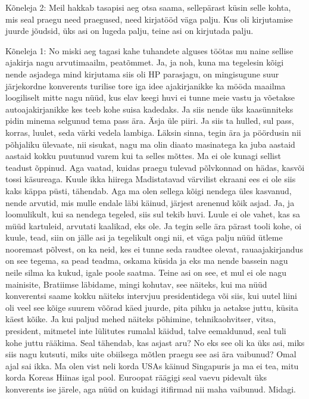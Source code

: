 Kõneleja 2:
Meil hakkab tasapisi aeg otsa saama, sellepärast küsin selle kohta, mis seal praegu need praegused, need kirjatööd väga palju. Kus oli kirjutamise juurde jõudsid, üks asi on lugeda palju, teine asi on kirjutada palju.
                 
Kõneleja 1:
No miski aeg tagasi kahe tuhandete alguses töötas mu naine sellise ajakirja nagu arvutimaailm, peatõmmet.
Ja, ja noh, kuna ma tegelesin kõigi nende asjadega mind kirjutama siis oli HP parasjagu, on mingisugune suur järjekordne konverents turilise tore iga idee ajakirjanikke ka mööda maailma loogiliselt mitte nagu nüüd, kus elav keegi huvi ei tunne meie vastu ja võetakse autoajakirjanikke kes teeb kohe suisa kadedaks.
Ja siis nende üks kaasünniteks pidin minema selgunud tema pass ära. Äsja üle piiri.
Ja siis ta hulled, sul pass, korras, luulet, seda värki vedela lambiga. Läksin sinna, tegin ära ja pöördusin nii põhjaliku ülevaate, nii sisukat, nagu ma olin diaato masinatega ka juba aastaid aastaid kokku puutunud varem kui ta selles mõttes. Ma ei ole kunagi sellist teadust õppinud. Aga vaatad, kuidas praegu tulevad põlvkonnad on hädas, kasvõi tossi käsureaga. Kuule ikka hiirega Madistatavad värvilist ekraani ees ei ole siis kaks käppa püsti, tähendab. Aga ma olen sellega kõigi nendega üles kasvanud, nende arvutid, mis mulle endale läbi käinud, järjest arenenud kõik asjad. Ja, ja loomulikult, kui sa nendega tegeled, siis sul tekib huvi. Luule ei ole vahet, kas sa müüd kartuleid, arvutati kaalikad, eks ole. Ja tegin selle ära pärast tooli kohe, oi kuule, tead, siin on jälle asi ja tegelikult ongi nii, et väga palju nüüd ütleme nooremast põlvest, on ka neid, kes ei tunne seda raudtee olevat, rauaajakirjandus on see tegema, sa pead teadma, oskama küsida ja eks ma nende bassein nagu neile silma ka kukud, igale poole saatma. Teine asi on see, et mul ei ole nagu mainisite, Bratiimse läbidame, mingi kohutav, see näiteks, kui ma nüüd konverentsi saame kokku näiteks intervjuu presidentidega või siis, kui uutel liini oli veel see kõige suurem võõrad käed juurde, pita pihku ja aetakse juttu, küsita käest kõike. Ja kui paljud mehed näiteks põhimine, tehnikaohvitser, vitsa, president, mitmetel inte lülitutes rumalal käidud, talve eemaldunud, seal tuli kohe juttu rääkima. Seal tähendab, kas asjast aru? No eks see oli ka üks asi, miks siis nagu kutsuti, miks uite obiilsega mõtlen praegu see asi ära vaibunud? Omal ajal sai ikka. Ma olen vist neli korda USAs käinud Singapuris ja ma ei tea, mitu korda Koreas Hiinas igal pool. Euroopat räägigi seal vaevu pidevalt üks konverents ise järele, aga nüüd on kuidagi itifirmad nii maha vaibunud. Midagi.
                 
